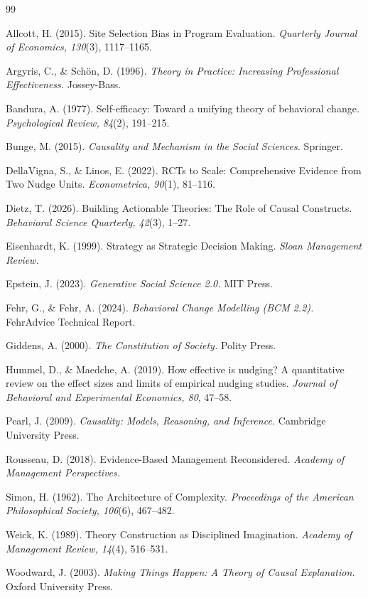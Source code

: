 \documentclass[12pt,a4paper]{article}
\begin{document}
\begin{thebibliography}{99}

Allcott, H. (2015). Site Selection Bias in Program Evaluation. \textit{Quarterly Journal of Economics, 130}(3), 1117--1165.

Argyris, C., \& Schön, D. (1996). \textit{Theory in Practice: Increasing Professional Effectiveness.} Jossey-Bass.

Bandura, A. (1977). Self-efficacy: Toward a unifying theory of behavioral change. \textit{Psychological Review, 84}(2), 191--215.

Bunge, M. (2015). \textit{Causality and Mechanism in the Social Sciences.} Springer.

DellaVigna, S., \& Linos, E. (2022). RCTs to Scale: Comprehensive Evidence from Two Nudge Units. \textit{Econometrica, 90}(1), 81--116.

Dietz, T. (2026). Building Actionable Theories: The Role of Causal Constructs. \textit{Behavioral Science Quarterly, 42}(3), 1--27.

Eisenhardt, K. (1999). Strategy as Strategic Decision Making. \textit{Sloan Management Review.}

Epstein, J. (2023). \textit{Generative Social Science 2.0.} MIT Press.

Fehr, G., \& Fehr, A. (2024). \textit{Behavioral Change Modelling (BCM 2.2).} FehrAdvice Technical Report.

Giddens, A. (2000). \textit{The Constitution of Society.} Polity Press.

Hummel, D., \& Maedche, A. (2019). How effective is nudging? A quantitative review on the effect sizes and limits of empirical nudging studies. \textit{Journal of Behavioral and Experimental Economics, 80}, 47--58.

Pearl, J. (2009). \textit{Causality: Models, Reasoning, and Inference.} Cambridge University Press.

Rousseau, D. (2018). Evidence-Based Management Reconsidered. \textit{Academy of Management Perspectives.}

Simon, H. (1962). The Architecture of Complexity. \textit{Proceedings of the American Philosophical Society, 106}(6), 467--482.

Weick, K. (1989). Theory Construction as Disciplined Imagination. \textit{Academy of Management Review, 14}(4), 516--531.

Woodward, J. (2003). \textit{Making Things Happen: A Theory of Causal Explanation.} Oxford University Press.

\end{thebibliography}
\end{document}
